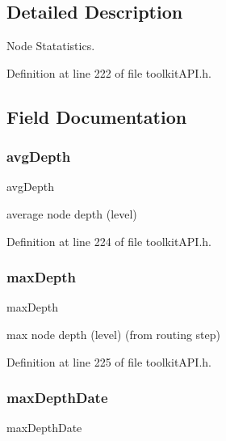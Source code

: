 \subsection{Detailed Description}
Node Statatistics. 

Definition at line 222 of file toolkit\+A\+P\+I.\+h.



\subsection{Field Documentation}
\mbox{\label{struct_s_m___node_stats_a230b577dcfb5e235aa9e9a3248f6982b}} 
\subsubsection{\texorpdfstring{avg\+Depth}{avgDepth}}
{\footnotesize\ttfamily avg\+Depth}

average node depth (level) 

Definition at line 224 of file toolkit\+A\+P\+I.\+h.

\mbox{\label{struct_s_m___node_stats_a7228dabd4235761cf24edaa63c29ac5e}} 
\subsubsection{\texorpdfstring{max\+Depth}{maxDepth}}
{\footnotesize\ttfamily max\+Depth}

max node depth (level) (from routing step) 

Definition at line 225 of file toolkit\+A\+P\+I.\+h.

\mbox{\label{struct_s_m___node_stats_a06b896990c03d273d975875c2032240e}} 
\subsubsection{\texorpdfstring{max\+Depth\+Date}{maxDepthDate}}
{\footnotesize\ttfamily max\+Depth\+Date}

